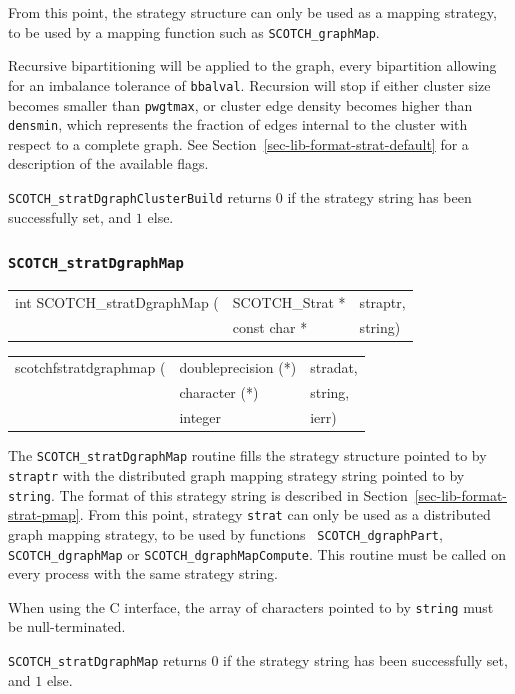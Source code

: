 \begin{itemize}
From this point, the strategy structure
can only be used as a mapping strategy, to be used by a mapping
function such as {\tt SCOTCH\_\lbt graph\lbt Map}.

Recursive bipartitioning will be applied to the graph, every
bipartition allowing for an imbalance tolerance of {\tt bbalval}.
Recursion will stop if either cluster size becomes smaller than
{\tt pwgtmax}, or cluster edge density becomes higher than
{\tt densmin}, which represents the fraction of edges internal to the
cluster with respect to a complete graph. See
Section~\ref{sec-lib-format-strat-default} for a description of the
available flags.

\progret

{\tt SCOTCH\_stratDgraphClusterBuild} returns $0$ if the strategy string
has been successfully set, and $1$ else.
\end{itemize}

\subsubsection{{\tt SCOTCH\_stratDgraphMap}}

\begin{itemize}
\progsyn

{\tt\begin{tabular}{l@{}ll}
int SCOTCH\_stratDgraphMap ( & SCOTCH\_Strat * & straptr, \\
                             & const char *    & string)
\end{tabular}}

{\tt\begin{tabular}{l@{}ll}
scotchfstratdgraphmap ( & doubleprecision (*) & stradat, \\
                        & character (*)       & string,  \\
                        & integer             & ierr)
\end{tabular}}

\progdes

The {\tt SCOTCH\_stratDgraphMap} routine fills the strategy
structure pointed to by {\tt straptr} with the distributed graph
mapping strategy string pointed to by {\tt string}. The format of this
strategy string is described in Section~\ref{sec-lib-format-strat-pmap}.
From this point, strategy {\tt strat} can only be used as a
distributed graph mapping strategy, to be used by functions {\tt
SCOTCH\_\lbt dgraph\lbt Part}, {\tt SCOTCH\_\lbt dgraph\lbt Map} or
{\tt SCOTCH\_\lbt dgraph\lbt Map\lbt Compute}. This routine must be
called on every process with the same strategy string.

When using the C interface, the array of characters pointed to by
{\tt string} must be null-terminated.

\progret

{\tt SCOTCH\_stratDgraphMap} returns $0$ if the strategy string
has been successfully set, and $1$ else.
\end{itemize}

